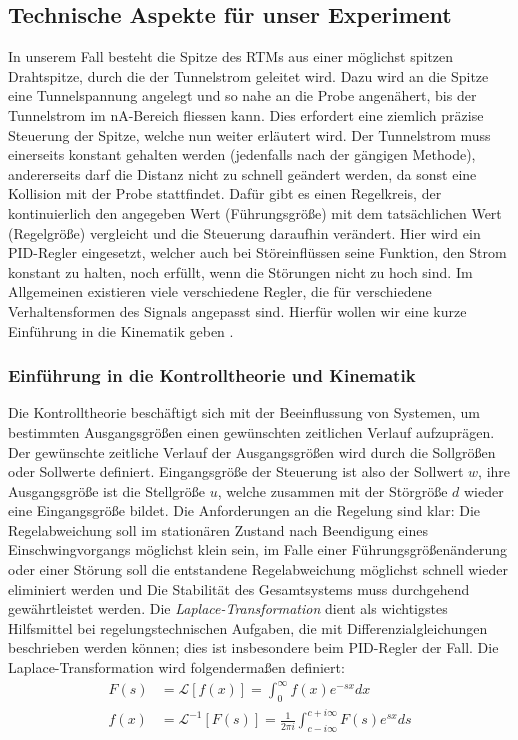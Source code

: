 \subsection{Technische Aspekte für unser Experiment}
In unserem Fall besteht die Spitze des RTMs aus einer möglichst spitzen
Drahtspitze, durch die der Tunnelstrom geleitet wird. Dazu wird an die Spitze eine 
Tunnelspannung angelegt und so nahe an die Probe angenähert, bis der Tunnelstrom 
im nA-Bereich fliessen kann.
Dies erfordert eine ziemlich präzise Steuerung der Spitze, welche nun weiter erläutert wird.
Der Tunnelstrom muss einerseits konstant gehalten werden (jedenfalls nach der gängigen Methode),
andererseits darf die Distanz nicht zu schnell geändert werden, da sonst eine Kollision mit der
Probe stattfindet. Dafür gibt es einen Regelkreis, der kontinuierlich den angegeben Wert
(Führungsgröße) mit dem
tatsächlichen Wert (Regelgröße) vergleicht und
die Steuerung daraufhin verändert. Hier wird ein PID-Regler
eingesetzt, welcher auch bei Störeinflüssen seine Funktion, den Strom konstant zu halten,
noch erfüllt, wenn die Störungen nicht zu hoch sind. Im Allgemeinen existieren viele
verschiedene Regler, die für verschiedene Verhaltensformen des Signals angepasst sind. 
Hierfür wollen wir eine kurze Einführung in die Kinematik geben \cite{regelungstechnik}.
\subsubsection{Einführung in die Kontrolltheorie und Kinematik}
Die Kontrolltheorie beschäftigt sich mit der Beeinflussung von Systemen, um bestimmten
Ausgangsgrößen einen gewünschten zeitlichen Verlauf aufzuprägen\cite{regelungstechnik}.
Der gewünschte zeitliche Verlauf der Ausgangsgrößen wird durch die Sollgrößen oder Sollwerte
definiert. Eingangsgröße der Steuerung ist also der Sollwert $w$, ihre Ausgangsgröße ist die 
Stellgröße $u$, welche zusammen mit der Störgröße $d$ wieder eine Eingangsgröße bildet. Die 
Anforderungen an die Regelung sind klar: Die Regelabweichung soll im stationären Zustand
 nach Beendigung
eines Einschwingvorgangs möglichst klein sein, im Falle einer Führungsgrößenänderung oder einer
Störung soll die entstandene Regelabweichung möglichst schnell wieder eliminiert werden und
Die Stabilität des Gesamtsystems muss durchgehend gewährtleistet werden. 
Die \textit{Laplace-Transformation} \cite{regelungstechnik2} dient als wichtigstes Hilfsmittel
bei regelungstechnischen Aufgaben, die mit Differenzialgleichungen beschrieben werden können; dies
ist insbesondere beim PID-Regler der Fall. Die Laplace-Transformation wird folgendermaßen definiert:
\begin{align}
F(s) &= \mathcal{L}\left [f(x)\right ] = \int_{0}^{\infty}f(x)e^{-sx}dx \\
f(x) &= \mathcal{L}^{-1}\left [F(s)\right ] = 
\frac{1}{2\pi i} \int_{c - i\infty}^{c+ i\infty} F(s)e^{sx}ds
\end{align} 

